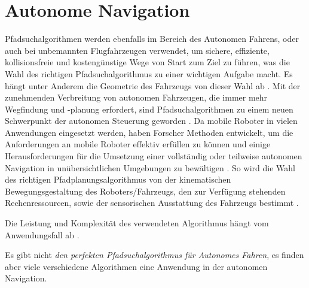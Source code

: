 \newpage

\section{Autonome Navigation}
\label{Autonome Navigation}

Pfadsuchalgorithmen werden ebenfalls im Bereich des Autonomen Fahrens, oder auch bei unbemannten Flugfahrzeugen verwendet,
um sichere, effiziente, kollisionsfreie und kostengünstige Wege von Start zum Ziel zu führen, was die Wahl des richtigen Pfadsuchalgorithmus
zu einer wichtigen Aufgabe macht. Es hängt unter Anderem die Geometrie des Fahrzeugs von dieser Wahl ab \cite{Karur:21}.
Mit der zunehmenden Verbreitung von autonomen Fahrzeugen, die immer mehr Wegfindung und -planung erfordert, sind Pfadsuchalgorithmen
zu einem neuen Schwerpunkt der autonomen Steuerung geworden \cite{Karur:21}.
Da mobile Roboter in vielen Anwendungen eingesetzt werden, haben Forscher Methoden entwickelt, um die 
Anforderungen an mobile Roboter effektiv erfüllen zu können und einige Herausforderungen für die Umsetzung einer vollständig oder
teilweise autonomen Navigation in unübersichtlichen Umgebungen zu bewältigen \cite{Karur:21}.
So wird die Wahl des richtigen Pfadplanungsalgorithmus von der kinematischen Bewegungsgestaltung des Roboters/Fahrzeugs,
den zur Verfügung stehenden Rechenressourcen, sowie der sensorischen Ausstattung des Fahrzeugs bestimmt \cite{Karur:21}.

Die Leistung und Komplexität des verwendeten Algorithmus hängt vom Anwendungsfall ab \cite{Karur:21}.

Es gibt nicht \emph{den perfekten Pfadsuchalgorithmus für Autonomes Fahren}, es finden aber viele verschiedene Algorithmen eine 
Anwendung in der autonomen Navigation.